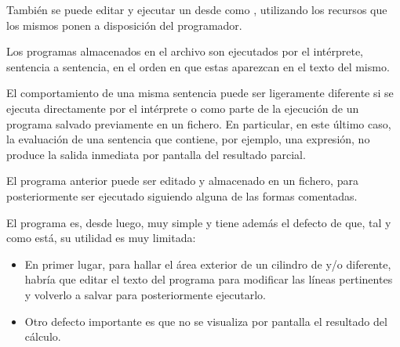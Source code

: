 \documentclass[letterpaper,10pt,english]{sphinxmanual}
\begin{document}
También se puede editar y ejecutar un  desde  como , utilizando los recursos que los mismos ponen a disposición del programador.

Los programas almacenados en el archivo son ejecutados por el intérprete, sentencia a sentencia, en el orden en que estas aparezcan en el texto del mismo.

El comportamiento de una misma sentencia puede ser ligeramente diferente si se ejecuta directamente por el intérprete o como parte de la ejecución de un programa salvado previamente en un fichero. En particular, en este último caso, la evaluación de una sentencia que contiene, por ejemplo, una expresión, no produce la salida inmediata por pantalla del resultado parcial.

\begin{sphinxVerbatim}[commandchars=\\\{\}]

  
  
  

  
  
    
\end{sphinxVerbatim}

El programa anterior puede ser editado y almacenado en un fichero, para posteriormente ser ejecutado siguiendo alguna de las formas comentadas.

El programa es, desde luego, muy simple y tiene además el defecto de que, tal y como está, su utilidad es muy limitada:
\begin{itemize}
\item {} 
En primer lugar, para hallar el área exterior de un cilindro de  y/o  diferente, habría que editar el texto del programa para modificar las líneas pertinentes y volverlo a salvar para posteriormente ejecutarlo.

\item {} 
Otro defecto importante es que no se visualiza por pantalla el resultado del cálculo.

\end{itemize}
\end{document}
